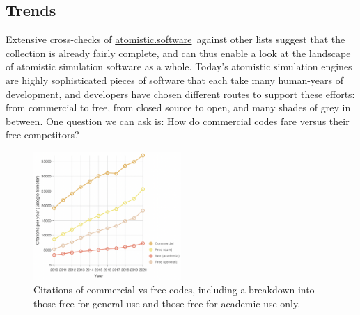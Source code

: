 \documentclass[9pt,review]{livecoms}
\newcommand{\atsoft}{\href{https://atomistic.software}{atomistic.software}\ }
\begin{document}
\subsection{Trends}
%

Extensive cross-checks of \atsoft against other lists \cite{qm-codes-wiki,mm-codes-wiki,sklog-wiki,Pirhadi2016,MolSSI2021} 
suggest that the collection is already fairly complete,
and can thus enable a look at the landscape of atomistic simulation software as a whole. 
Today's atomistic simulation engines are highly sophisticated pieces of software that each take many human-years of development, and developers have chosen different routes to support these efforts: 
from commercial to free, from closed source to open, and many shades of grey in between.
One question we can ask is: How do commercial codes fare versus their free competitors?

\begin{figure}
    \includegraphics[width=0.5\textwidth]{figures/money}
    \caption{
        Citations of commercial vs free codes, including a breakdown into those free for general use and those free for academic use only.
    }
    \label{fig:money}
\end{figure}
\end{document}
